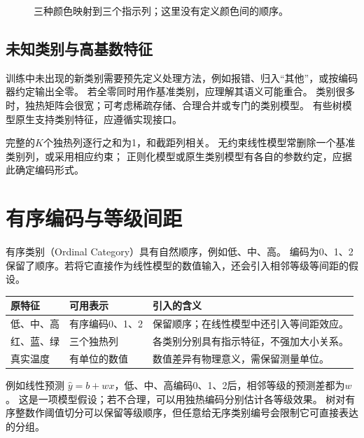 \begin{figure}[htbp]
\centering
\caption{三种颜色映射到三个指示列；这里没有定义颜色间的顺序。}
\par\smallskip
{}
\end{figure}

\subsection{未知类别与高基数特征}
训练中未出现的新类别需要预先定义处理方法，例如报错、归入“其他”，或按编码器约定输出全零。
若全零同时用作基准类别，应理解其语义可能重合。
类别很多时，独热矩阵会很宽；可考虑稀疏存储、合理合并或专门的类别模型。
有些树模型原生支持类别特征，应遵循实现接口。

\begin{pitfall}[独热列与截距可能线性相关]
完整的$K$个独热列逐行之和为1，和截距列相关。
无约束线性模型常删除一个基准类别列，或采用相应约束；
正则化模型或原生类别模型有各自的参数约定，应据此确定编码形式。
\end{pitfall}

\section{有序编码与等级间距}
\label{sec:data-ordinal}
有序类别（Ordinal Category）具有自然顺序，例如低、中、高。
编码为0、1、2保留了顺序。若将它直接作为线性模型的数值输入，还会引入相邻等级等间距的假设。

\begin{center}
\begin{tabularx}{\textwidth}{P{27mm}P{30mm}Y}
\toprule
原特征 & 可用表示 & 引入的含义\\
\midrule
低、中、高 & 有序编码0、1、2 & 保留顺序；在线性模型中还引入等间距效应。\\
红、蓝、绿 & 三个独热列 & 各类别分别具有指示特征，不强加大小关系。\\
真实温度 & 有单位的数值 & 数值差异有物理意义，需保留测量单位。\\
\bottomrule
\end{tabularx}
\end{center}

例如线性预测 $\hat y=b+wx$，低、中、高编码0、1、2后，相邻等级的预测差都为$w$。
这是一项模型假设；若不合理，可以用独热编码分别估计各等级效果。
树对有序整数作阈值切分可以保留等级顺序，但任意给无序类别编号会限制它可直接表达的分组。

